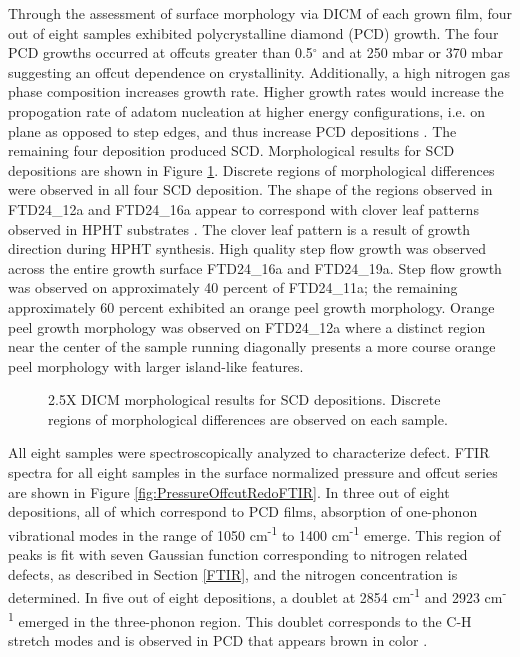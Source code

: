 Through the assessment of surface morphology via DICM of each grown film, four out of eight samples exhibited polycrystalline diamond (PCD) growth. The four PCD growths occurred at offcuts greater than 0.5$^\circ$ and at 250 mbar or 370 mbar suggesting an offcut dependence on crystallinity. Additionally, a high nitrogen gas phase composition increases growth rate. Higher growth rates would increase the propogation rate of adatom nucleation at higher energy configurations, i.e. on plane as opposed to step edges, and thus increase PCD depositions \cite{VanDerDrift1967EVOLUTIONARYLAYERS}. The remaining four deposition produced SCD. Morphological results for SCD depositions are shown in Figure \ref{fig:PressureOffcutRedoSCDDepoMorph}. Discrete regions of morphological differences were observed in all four SCD deposition. The shape of the regions observed in FTD24\_12a and FTD24\_16a appear to correspond with clover leaf patterns observed in HPHT substrates \cite{Anthony1995StressesDiamond}. The clover leaf pattern is a result of growth direction during HPHT synthesis. High quality step flow growth was observed across the entire growth surface FTD24\_16a and FTD24\_19a. Step flow growth was observed on approximately 40 percent of FTD24\_11a; the remaining approximately 60 percent exhibited an orange peel growth morphology. Orange peel growth morphology was observed on FTD24\_12a where a distinct region near the center of the sample running diagonally presents a more course orange peel morphology with larger island-like features.

\begin{figure}
    \centering
    
    \caption{2.5X DICM morphological results for SCD depositions. Discrete regions of morphological differences are observed on each sample.}
    \label{fig:PressureOffcutRedoSCDDepoMorph}
\end{figure}

All eight samples were spectroscopically analyzed to characterize defect. FTIR spectra for all eight samples in the surface normalized pressure and offcut series are shown in Figure \ref{fig:PressureOffcutRedoFTIR}. In three out of eight depositions, all of which correspond to PCD films, absorption of one-phonon vibrational modes in the range of 1050 cm\textsuperscript{-1} to 1400 cm\textsuperscript{-1} emerge. This region of peaks is fit with seven Gaussian function corresponding to nitrogen related defects, as described in Section \ref{FTIR}, and the nitrogen concentration is determined. In five out of eight depositions, a doublet at 2854 cm\textsuperscript{-1} and 2923 cm\textsuperscript{-1} emerged in the three-phonon region. This doublet corresponds to the C-H stretch modes and is observed in PCD that appears brown in color \cite{Sussmann1994PropertiesDiamond, Wort1994ThermalDiamond}.

